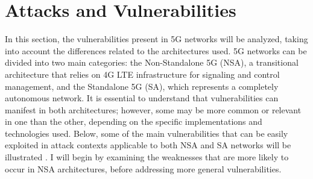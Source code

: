 \documentclass[english]{article}
\begin{document}
\section{Attacks and Vulnerabilities}\label{sec:5}
In this section, the vulnerabilities present in 5G networks will be analyzed,
taking into account the differences related to the architectures used. 5G
networks can be divided into two main categories: the Non-Standalone 5G (NSA),
a transitional architecture that relies on 4G LTE infrastructure for signaling
and control management, and the Standalone 5G (SA), which represents a
completely autonomous network. It is essential to understand that
vulnerabilities can manifest in both architectures; however, some may be more
common or relevant in one than the other, depending on the specific
implementations and technologies used. Below, some of the main vulnerabilities
that can be easily exploited in attack contexts applicable to both NSA and SA
networks will be illustrated \cite{Park20215G}. I will begin by examining the
weaknesses that are more likely to occur in NSA architectures, before
addressing more general vulnerabilities.
\end{document}
